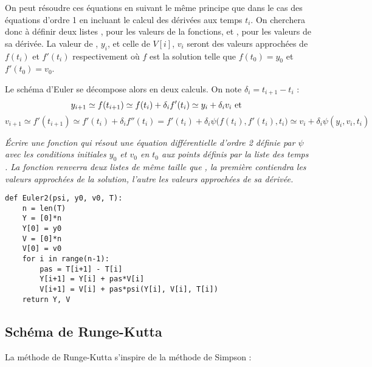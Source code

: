 On peut résoudre ces équations en suivant le même principe que dans le cas des équations d'ordre 1 en incluant le calcul des dérivées aux temps $t_i$. On cherchera donc à définir deux listes , pour les valeurs de la fonctions, et , pour les valeurs de sa dérivée. La valeur de , $y_i$, et celle de $V[i]$, $v_i$ seront des valeurs approchées de $f(t_i)$ et $f'(t_i)$ respectivement où $f$ est la solution telle que $f(t_0) = y_0$ et $f'(t_0)= v_0$.

Le schéma d'Euler se décompose alors en deux calculs. On note $\delta_i = t_{i+1} - t_i$ :
  \[y_{i+1}\simeq f(t_{i+1}) \simeq f(t_i) + \delta_i f'(t_i)  \simeq y_i + \delta_i v_i\hbox{ et }\]
  \[v_{i+1}\simeq f'(t_{i+1}) \simeq f'(t_i) + \delta_if''(t_i) = f'(t_i) + \delta_i\psi\bigl(f(t_i), f'(t_i),  t_i\bigr)\simeq v_i + \delta_i\psi(y_i, v_i, t_i)\]
\begin{Exercise}\it
Écrire une fonction  qui résout une équation différentielle d'ordre 2 définie par $\psi$ avec les conditions initiales $y_0$ et $v_0$ en $t_0$ aux points définis par la liste des temps . La fonction renverra deux listes de même taille que , la première contiendra les valeurs approchées de la solution, l'autre les valeurs approchées de sa dérivée.
\end{Exercise}
\begin{Answer}
\begin{lstlisting}
def Euler2(psi, y0, v0, T):
    n = len(T)           
    Y = [0]*n 
    Y[0] = y0 
    V = [0]*n 
    V[0] = v0 
    for i in range(n-1): 
        pas = T[i+1] - T[i]
        Y[i+1] = Y[i] + pas*V[i]
        V[i+1] = V[i] + pas*psi(Y[i], V[i], T[i])
    return Y, V 
\end{lstlisting}
\newpage
\end{Answer}
\subsection{Schéma de Runge-Kutta}
La méthode de Runge-Kutta s'inspire de la méthode de Simpson : 

